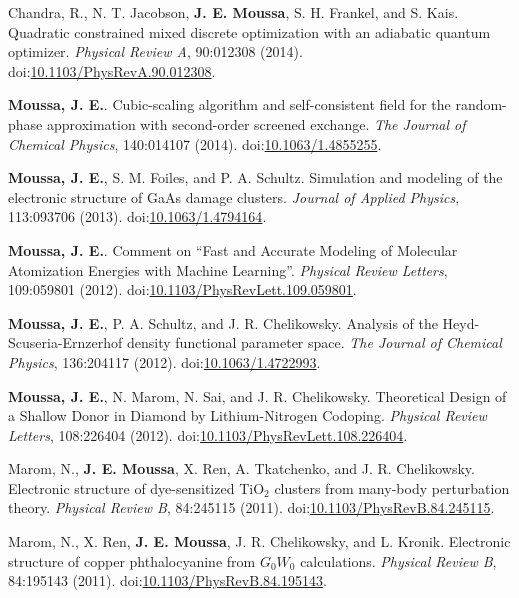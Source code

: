 \documentclass[10pt]{article}
\makeatletter
\newlength{\bibhang}
\newlength{\bibsep}
 {\@listi \global\bibsep\itemsep \global\advance\bibsep by\parsep}
\newenvironment{bibsection}%
        {\vspace{-1.6\baselineskip}\begin{etaremune}[leftmargin=1.6em]{%
       \setlength{\leftmargin}{\bibhang}%
       \setlength{\itemindent}{-\leftmargin}%
       \setlength{\itemsep}{\bibsep}%
       \setlength{\parsep}{\z@}%
        \setlength{\partopsep}{0pt}%
        \setlength{\topsep}{0pt}}}
        {\end{etaremune}\vspace{-.6\baselineskip}}
\newcommand\doilink[1]{\href{http://dx.doi.org/#1}{#1}}
\newcommand\doi[1]{doi:\doilink{#1}}
\makeatother
\begin{document}
\begin{bibsection}
    \item Chandra, R., N. T. Jacobson, \textbf{J. E. Moussa}, S. H. Frankel, and S. Kais. Quadratic constrained mixed discrete optimization with an adiabatic quantum optimizer.
     \emph{Physical Review A}, 90:012308 (2014). \doi{10.1103/PhysRevA.90.012308}.

    \item \textbf{Moussa, J. E.}. Cubic-scaling algorithm and self-consistent field for the random-phase approximation with second-order screened exchange.
     \emph{The Journal of Chemical Physics}, 140:014107 (2014). \doi{10.1063/1.4855255}.

    \item \textbf{Moussa, J. E.}, S. M. Foiles, and P. A. Schultz.
         Simulation and modeling of the electronic structure of GaAs damage clusters.
         \emph{Journal of Applied Physics}, 113:093706 (2013). \doi{10.1063/1.4794164}.

    \item \textbf{Moussa, J. E.}.
         Comment on ``Fast and Accurate Modeling of Molecular Atomization Energies with Machine Learning''.
         \emph{Physical Review Letters}, 109:059801 (2012). \doi{10.1103/PhysRevLett.109.059801}.

    \item \textbf{Moussa, J. E.}, P. A. Schultz, and J. R. Chelikowsky.
         Analysis of the Heyd-Scuseria-Ernzerhof density functional parameter space.
         \emph{The Journal of Chemical Physics}, 136:204117 (2012). \doi{10.1063/1.4722993}.

    \item \textbf{Moussa, J. E.}, N. Marom, N. Sai, and J. R. Chelikowsky.
         Theoretical Design of a Shallow Donor in Diamond by Lithium-Nitrogen Codoping.
         \emph{Physical Review Letters}, 108:226404 (2012). \doi{10.1103/PhysRevLett.108.226404}.

    \item Marom, N., \textbf{J. E. Moussa}, X. Ren, A. Tkatchenko, and J. R. Chelikowsky.
         Electronic structure of dye-sensitized TiO$_2$ clusters from many-body perturbation theory.
         \emph{Physical Review B}, 84:245115 (2011). \doi{10.1103/PhysRevB.84.245115}.

    \item Marom, N., X. Ren, \textbf{J. E. Moussa}, J. R. Chelikowsky, and L. Kronik.
         Electronic structure of copper phthalocyanine from $G_0 W_0$ calculations.
         \emph{Physical Review B}, 84:195143 (2011). \doi{10.1103/PhysRevB.84.195143}.


\end{bibsection}
\end{document}
